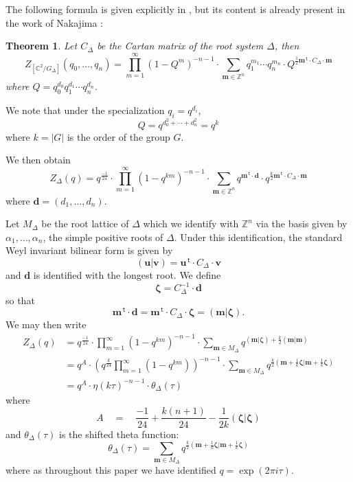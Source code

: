 \documentclass{amsart}
\newtheorem{theorem}{Theorem}[section]
\theoremstyle{definition}
\newcommand{\half}{\frac{1}{2}}
\newcommand{\CC} {{\mathbb C}}          %
\newcommand{\ZZ} {{\mathbb Z}}		%
\renewcommand{\top}{\,\mathsf{t}}
\newcommand{\mvec}{\bm{m}}
\newcommand{\zetavec}{\bm{\zeta }}
\newcommand{\dvec}{\bm{d }}
\newcommand{\uvec}{\bm{u }}
\newcommand{\vvec}{\bm{v }}
\begin{document}
The following formula is given explicitly in \cite[Thm~1.3]{gyenge2015euler}, but its content is already present in the work of Nakajima \cite{nakajima2002geometric}:
\begin{theorem} \label{thm: Zorbifold formula}
Let $C_{\Delta}$ be the Cartan matrix of the root system $\Delta$,
then 
\[
Z_{[\CC^{2}/G_{\Delta}]} (q_{0},\dotsc ,q_{n}) = \prod_{m=1}^{\infty}
(1-Q^{m})^{-n-1} \cdot \sum_{\mvec \in \ZZ^{n}} q_{1}^{m_{1}}\dotsb
q_{n}^{m_{n}} \cdot Q^{\half \mvec^{\top}\cdot C_{\Delta}\cdot \mvec}
\]
where $Q=q_{0}^{d_{0}}q_{1}^{d_{1}}\dotsb q_{n}^{d_{n}}$.
\end{theorem}
We note that under the specialization $q_{i}=q^{d_{i}}$, 
\[
Q=q^{d_{0}^{2}+\dotsb +d_{n}^{2}} = q^{k}
\]
where $k=|G|$ is the order of the group $G$.

We then obtain
\[
Z_{\Delta}(q) = q^{\frac{-1}{24}}\cdot
\prod_{m=1}^{\infty}(1-q^{km})^{-n-1} \cdot \sum_{\mvec \in \ZZ^{n}}
q^{\mvec^{\top}\cdot \dvec} \cdot q^{\frac{k}{2}\mvec^{\top}\cdot C_{\Delta}\cdot \mvec}
\]
where $\dvec =(d_{1},\dotsc ,d_{n})$.

Let $M_{\Delta}$ be the root lattice of $\Delta$ which we identify
with $\ZZ^{n}$ via the basis given by $\alpha_{1},\dotsc ,\alpha_{n}$,
the simple positive roots of $\Delta$. Under this identification, the
standard Weyl invariant bilinear form is given by
\[
(\uvec |\vvec ) = \uvec^{\top}\cdot C_{\Delta}\cdot \vvec 
\]
and $\dvec$ is identified with the longest root. 
We define
\[
\zetavec = C_{\Delta}^{-1} \cdot \dvec 
\]
so that 
\[
\mvec^{\top}\cdot \dvec = \mvec^{\top}\cdot C_{\Delta} \cdot \zetavec
= (\mvec |\zetavec ).
\]
We may then write
\begin{align*}
Z_{\Delta}(q)& = q^{\frac{-1}{24}}\cdot
\prod_{m=1}^{\infty}(1-q^{km})^{-n-1}\cdot \sum _{\mvec \in M_{\Delta}} q^{(\mvec |\zetavec )+\frac{k}{2}(\mvec |\mvec)}\\
&= q^{A} \cdot \left(q^{\frac{k}{24}}\prod_{m=1}^{\infty}(1-q^{km})
\right)^{-n-1} \cdot \sum_{\mvec \in M_{\Delta}} q^{\frac{k}{2}\left(\mvec +\frac{1}{k}\zetavec |\mvec +\frac{1}{k}\zetavec  \right)}\\
& = q^{A}\cdot  \eta (k\tau )^{-n-1}\cdot  \theta_{\Delta} (\tau )
\end{align*}
where 
\[
A \quad = \quad \frac{-1}{24} + \frac{k(n+1)}{24} - \frac{1}{2k}(\zetavec
|\zetavec )
\]
and $\theta_{\Delta}(\tau )$ is the shifted theta function:
\begin{equation}\label{eqn: defn of shifted theta function}
\theta_{\Delta}(\tau ) = \sum_{\mvec \in M_{\Delta}} q^{\frac{k}{2}\left(\mvec +\frac{1}{k}\zetavec |\mvec +\frac{1}{k}\zetavec  \right)}
\end{equation}
where as throughout this paper we have identified $q=\exp\left(2\pi i\tau  \right)$.
\end{document}
